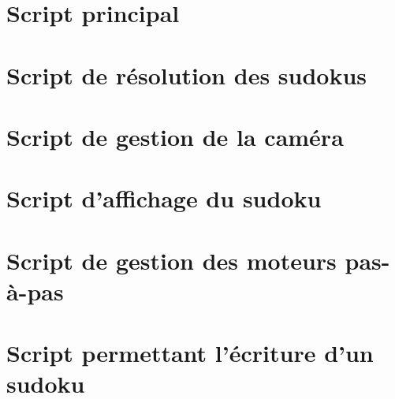 \printbibliography
\nocite{*}
\appendix

\begin{changemargin}{-2cm}{-4cm}

\label{Scripts}
\chapter*{Script principal}
\label{main}

\chapter*{Script de résolution des sudokus}
\label{resolution}

\chapter*{Script de gestion de la caméra}
\label{camera}

\chapter*{Script d'affichage du sudoku}
\label{display}

\chapter*{Script de gestion des moteurs pas-à-pas}
\label{step_motor}

\chapter*{Script permettant l'écriture d'un sudoku}
\label{write}


\end{changemargin}
